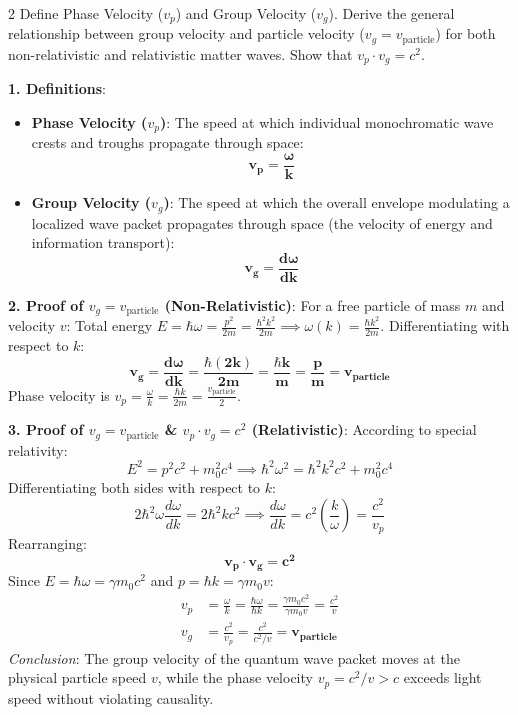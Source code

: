 \begin{theoryq}{2}
Define Phase Velocity ($v_p$) and Group Velocity ($v_g$). Derive the general relationship between group velocity and particle velocity ($v_g = v_{\text{particle}}$) for both non-relativistic and relativistic matter waves. Show that $v_p \cdot v_g = c^2$.
\end{theoryq}
\begin{theorysol}
\textbf{1. Definitions}:
\begin{itemize}
    \item \textbf{Phase Velocity ($v_p$)}: The speed at which individual monochromatic wave crests and troughs propagate through space:
    \begin{equation}
    \mathbf{v_p = \frac{\omega}{k}}
    \end{equation}
    \item \textbf{Group Velocity ($v_g$)}: The speed at which the overall envelope modulating a localized wave packet propagates through space (the velocity of energy and information transport):
    \begin{equation}
    \mathbf{v_g = \frac{d\omega}{dk}}
    \end{equation}
\end{itemize}

\textbf{2. Proof of $v_g = v_{\text{particle}}$ (Non-Relativistic)}:
For a free particle of mass $m$ and velocity $v$:
Total energy $E = \hbar\omega = \frac{p^2}{2m} = \frac{\hbar^2 k^2}{2m} \implies \omega(k) = \frac{\hbar k^2}{2m}$.
Differentiating with respect to $k$:
\begin{equation}
\mathbf{v_g = \frac{d\omega}{dk} = \frac{\hbar(2k)}{2m} = \frac{\hbar k}{m} = \frac{p}{m} = v_{\text{particle}}}
\end{equation}
Phase velocity is $v_p = \frac{\omega}{k} = \frac{\hbar k}{2m} = \frac{v_{\text{particle}}}{2}$.

\textbf{3. Proof of $v_g = v_{\text{particle}}$ \& $v_p \cdot v_g = c^2$ (Relativistic)}:
According to special relativity:
\begin{equation}
E^2 = p^2 c^2 + m_0^2 c^4 \implies \hbar^2 \omega^2 = \hbar^2 k^2 c^2 + m_0^2 c^4
\end{equation}
Differentiating both sides with respect to $k$:
\begin{equation}
2\hbar^2 \omega \frac{d\omega}{dk} = 2\hbar^2 k c^2 \implies \frac{d\omega}{dk} = c^2 \left(\frac{k}{\omega}\right) = \frac{c^2}{v_p}
\end{equation}
Rearranging:
\begin{equation}
\mathbf{v_p \cdot v_g = c^2}
\end{equation}
Since $E = \hbar\omega = \gamma m_0 c^2$ and $p = \hbar k = \gamma m_0 v$:
\begin{align}
v_p &= \frac{\omega}{k} = \frac{\hbar\omega}{\hbar k} = \frac{\gamma m_0 c^2}{\gamma m_0 v} = \frac{c^2}{v} \\
v_g &= \frac{c^2}{v_p} = \frac{c^2}{c^2/v} = \mathbf{v_{\text{particle}}}
\end{align}
\textit{Conclusion}: The group velocity of the quantum wave packet moves at the physical particle speed $v$, while the phase velocity $v_p = c^2/v > c$ exceeds light speed without violating causality.
\end{theorysol}
